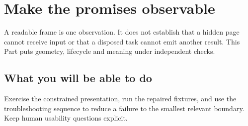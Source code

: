 \chapter*{Make the promises observable}

A readable frame is one observation. It does not establish that a hidden page cannot receive input or that a disposed task cannot emit another result. This Part puts geometry, lifecycle and meaning under independent checks.

\section*{What you will be able to do}

Exercise the constrained presentation, run the repaired fixtures, and use the troubleshooting sequence to reduce a failure to the smallest relevant boundary. Keep human usability questions explicit.
